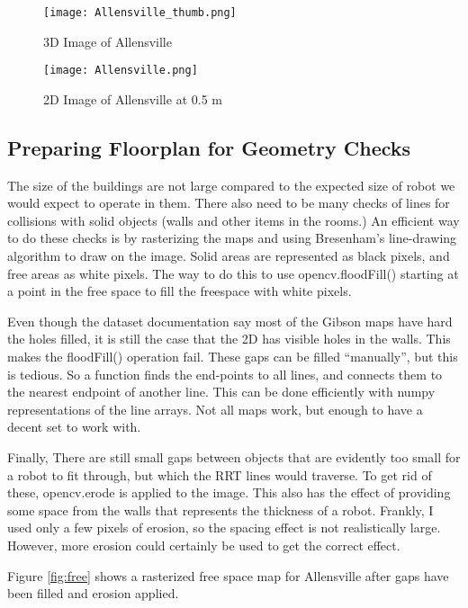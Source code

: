 \documentclass[10pt,twocolumn,letterpaper]{article}
\begin{document}
\begin{centering}
\begin{figure}[ht]
\caption{3D Image of Allensville}
\centering
\texttt{[image: Allensville\_thumb.png]}
\label{fig:Allensville_3D}
\end{figure}
\begin{figure}[ht]
\caption{2D Image of Allensville at 0.5 m}
\centering
\texttt{[image: Allensville.png]}
\label{fig:Allensville_2D}
\end{figure}
\end{centering}

\subsection{Preparing Floorplan for Geometry Checks}

The size of the buildings are not large compared to the expected size
of robot we would expect to operate in them. There also need to be
many checks of lines for collisions with solid objects (walls and
other items in the rooms.) An efficient way to do these checks is by
rasterizing the maps and using Bresenham's line-drawing algorithm to
draw on the image. Solid areas are represented as black pixels, and
free areas as white pixels. The way to do this to use opencv.floodFill()
starting at a point in the free space to fill the freespace with white
pixels.

Even though the dataset documentation say most of the Gibson maps have
hard the holes filled, it is still the case that the 2D has visible
holes in the walls. This makes the floodFill() operation fail. These
gaps can be filled ``manually'', but this is tedious. So a function
finds the end-points to all lines, and connects them to the nearest
endpoint of another line. This can be done efficiently with numpy
representations of the line arrays. Not all maps work, but enough to
have a decent set to work with.

Finally, There are still small gaps between objects that are evidently
too small for a robot to fit through, but which the RRT lines would
traverse. To get rid of these, opencv.erode is applied to the
image. This also has the effect of providing some space from the walls
that represents the thickness of a robot. Frankly, I used only a few
pixels of erosion, so the spacing effect is not realistically
large. However, more erosion could certainly be used to get the
correct effect.

Figure \ref{fig:free} shows a rasterized free space map for Allensville after
gaps have been filled and erosion applied.
\end{document}
